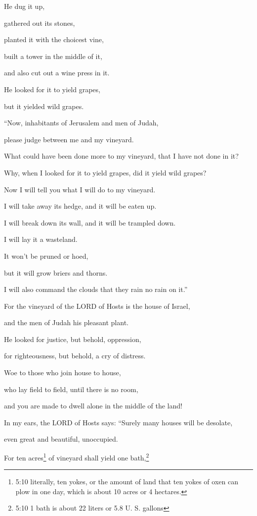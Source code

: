 \myverse{}He dug it up,

gathered out its stones,

planted it with the choicest vine,

built a tower in the middle of it,

and also cut out a wine press in it.

He looked for it to yield grapes,

but it yielded wild grapes.


\vspace{\baselineskip} \myverse{}“Now, inhabitants of Jerusalem and men of Judah,

please judge between me and my vineyard.

\myverse{}What could have been done more to my vineyard, that I have not
done in it?

Why, when I looked for it to yield grapes, did it yield wild grapes?

\myverse{}Now I will tell you what I will do to my vineyard.

I will take away its hedge, and it will be eaten up.

I will break down its wall, and it will be trampled down.

\myverse{}I will lay it a wasteland.

It won’t be pruned or hoed,

but it will grow briers and thorns.

I will also command the clouds that they rain no rain on it.”

\myverse{}For the vineyard of the LORD of Hosts is the house of Israel,

and the men of Judah his pleasant plant.

He looked for justice, but behold, oppression,

for righteousness, but behold, a cry of distress.


\vspace{\baselineskip} \myverse{}Woe to those who join house to house,

who lay field to field, until there is no room,

and you are made to dwell alone in the middle of the land!

\myverse{}In my ears, the LORD of Hosts says: “Surely many houses will be
desolate,

even great and beautiful, unoccupied.

\myverse{}For ten acres\footnote{5:10 literally, ten yokes, or the amount of land that ten yokes of oxen can plow in one day, which
	is about 10 acres or 4 hectares.} of vineyard shall yield one bath,\footnote{5:10 1 bath is about 22 liters or 5.8 U. S. gallons}

